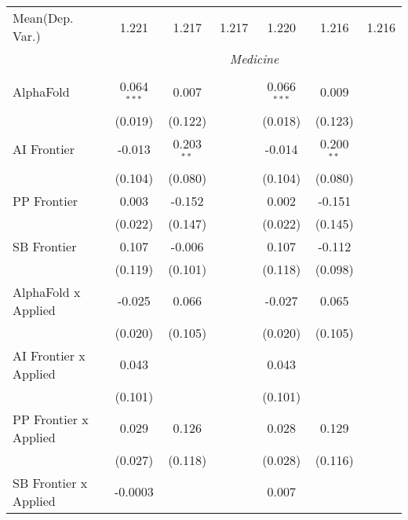 \begin{tabular}{lcccccc}
Mean(Dep. Var.) & 1.221 & 1.217 & 1.217 & 1.220 & 1.216 & 1.216 \\
 & \multicolumn{6}{c}{\textit{Medicine}} \\ \\
   AlphaFold                    & 0.064$^{***}$ & 0.007        &               & 0.066$^{***}$ & 0.009        &   \\   
                                & (0.019)       & (0.122)      &               & (0.018)       & (0.123)      &   \\   
   AI Frontier                  & -0.013        & 0.203$^{**}$ &               & -0.014        & 0.200$^{**}$ &   \\   
                                & (0.104)       & (0.080)      &               & (0.104)       & (0.080)      &   \\   
   PP Frontier                  & 0.003         & -0.152       &               & 0.002         & -0.151       &   \\   
                                & (0.022)       & (0.147)      &               & (0.022)       & (0.145)      &   \\   
   SB Frontier                  & 0.107         & -0.006       &               & 0.107         & -0.112       &   \\   
                                & (0.119)       & (0.101)      &               & (0.118)       & (0.098)      &   \\   
   AlphaFold x Applied          & -0.025        & 0.066        &               & -0.027        & 0.065        &   \\   
                                & (0.020)       & (0.105)      &               & (0.020)       & (0.105)      &   \\   
   AI Frontier x Applied        & 0.043         &              &               & 0.043         &              &   \\   
                                & (0.101)       &              &               & (0.101)       &              &   \\   
   PP Frontier x Applied        & 0.029         & 0.126        &               & 0.028         & 0.129        &   \\   
                                & (0.027)       & (0.118)      &               & (0.028)       & (0.116)      &   \\   
   SB Frontier x Applied        & -0.0003       &              &               & 0.007         &              &   \\   

\end{tabular}
